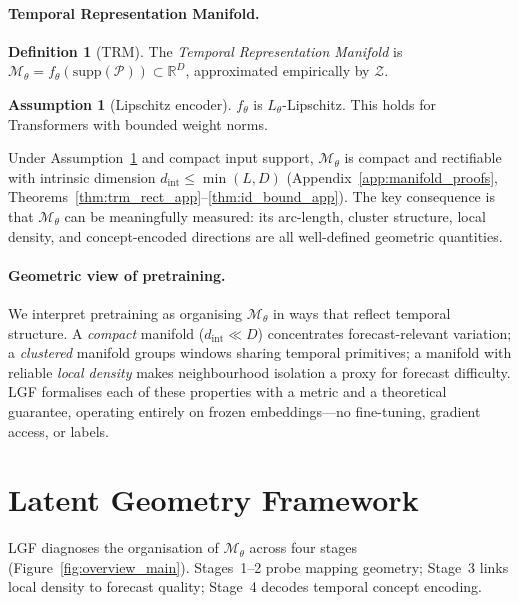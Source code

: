 \documentclass[10pt]{article}
\theoremstyle{definition}
\newtheorem{definition}[theorem]{Definition}
\newtheorem{assumption}[theorem]{Assumption}
\theoremstyle{remark}
\newcommand{\R}{\mathbb{R}}
\newcommand{\Zset}{\mathcal{Z}}
\newcommand{\trm}{\mathcal{M}_\theta}
\newcommand{\dint}{\ensuremath{d_{\mathrm{int}}}}
\begin{document}
\paragraph{Temporal Representation Manifold.}
\begin{definition}[TRM]
\label{def:trm}
The \emph{Temporal Representation Manifold} is
$\trm = f_\theta(\mathrm{supp}(\mathcal{P})) \subset \R^D$,
approximated empirically by $\Zset$.
\end{definition}
\begin{assumption}[Lipschitz encoder]
\label{asm:lipschitz}
$f_\theta$ is $L_\theta$-Lipschitz.
This holds for Transformers with bounded weight norms.
\end{assumption}
Under Assumption~\ref{asm:lipschitz} and compact input support, $\trm$ is
compact and rectifiable with intrinsic dimension
$\dint \leq \min(L,D)$ (Appendix~\ref{app:manifold_proofs},
Theorems~\ref{thm:trm_rect_app}--\ref{thm:id_bound_app}).
The key consequence is that $\trm$ can be meaningfully measured: its
arc-length, cluster structure, local density, and concept-encoded directions
are all well-defined geometric quantities.

\paragraph{Geometric view of pretraining.}
We interpret pretraining as organising $\trm$ in ways that reflect temporal
structure.
A \emph{compact} manifold ($\dint \ll D$) concentrates forecast-relevant
variation; a \emph{clustered} manifold groups windows sharing temporal
primitives; a manifold with reliable \emph{local density} makes
neighbourhood isolation a proxy for forecast difficulty.
LGF formalises each of these properties with a metric and a theoretical
guarantee, operating entirely on frozen embeddings---no fine-tuning, gradient
access, or labels.

\section{Latent Geometry Framework}
\label{sec:framework}

LGF diagnoses the organisation of $\trm$ across four stages
(Figure~\ref{fig:overview_main}).
Stages~1--2 probe mapping geometry; Stage~3 links local density to forecast
quality; Stage~4 decodes temporal concept encoding.
\end{document}

